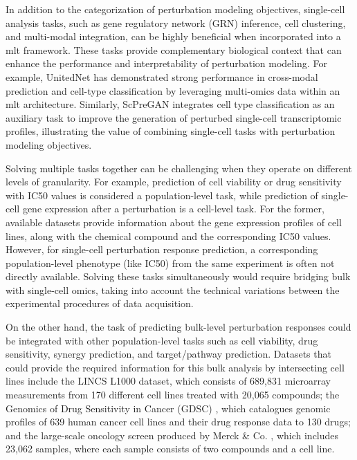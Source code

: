\documentclass[12pt, a4paper]{article}
\begin{document}
In addition to the categorization of perturbation modeling objectives, single-cell analysis tasks, such as gene regulatory network (GRN) inference, cell clustering, and multi-modal integration, can be highly beneficial when incorporated into a \gls{mlt} framework. These tasks provide complementary biological context that can enhance the performance and interpretability of perturbation modeling.
For example, UnitedNet \cite{tangExplainableMultitaskLearning2023} has demonstrated strong performance in cross-modal prediction and cell-type classification by leveraging multi-omics data within an \gls{mlt} architecture. Similarly, ScPreGAN \cite{weiScPreGANDeepGenerative2022} integrates cell type classification as an auxiliary task to improve the generation of perturbed single-cell transcriptomic profiles, illustrating the value of combining single-cell tasks with perturbation modeling objectives.

Solving multiple tasks together can be challenging when they operate on different levels of granularity. For example, prediction of cell viability or drug sensitivity with IC50 values is considered a population-level task, while prediction of single-cell gene expression after a perturbation is a cell-level task. For the former, available datasets provide information about the gene expression profiles of cell lines, along with the chemical compound and the corresponding IC50 values. However, for single-cell perturbation response prediction, a corresponding population-level phenotype (like IC50) from the same experiment is often not directly available. Solving these tasks simultaneously would require bridging bulk with single-cell omics, taking into account the technical variations between the experimental procedures of data acquisition.

On the other hand, the task of predicting bulk-level perturbation responses could be integrated with other population-level tasks such as cell viability, drug sensitivity, synergy prediction, and target/pathway prediction. Datasets that could provide the required information for this bulk analysis by intersecting cell lines include the LINCS L1000 \cite{subramanian2017next} dataset, which consists of 689,831 microarray measurements from 170 different cell lines treated with 20,065 compounds; the Genomics of Drug Sensitivity in Cancer (GDSC) \cite{iorio2016landscape}, which catalogues genomic profiles of 639 human cancer cell lines and their drug response data to 130 drugs; and the large-scale oncology screen produced by Merck \& Co. \cite{o2016unbiased}, which includes 23,062 samples, where each sample consists of two compounds and a cell line.
\end{document}
